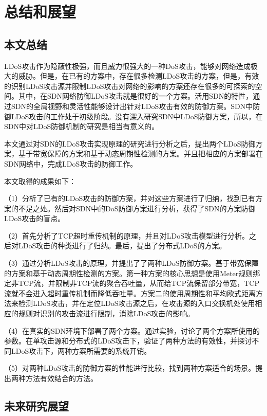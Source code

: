 \chapter{总结和展望}
\label{cha:conclusion}

\section{本文总结}
\label{chap6:conclusion}

LDoS攻击作为隐蔽性极强，而且威力很强大的一种DoS攻击，能够对网络造成极大的威胁。但是，在已有的方案中，存在很多检测LDoS攻击的方案，但是，有效的识别LDoS攻击源并限制LDoS攻击对网络的影响的方案还存在很多的可探索的空间。其中，在SDN网络防御LDoS攻击就是很好的一个方案。活用SDN的特性，通过SDN的全局视野和灵活性能够设计出针对LDoS攻击有效的防御方案。SDN中防御LDoS攻击的工作处于初级阶段。没有深入研究SDN中LDoS防御方案，所以，在SDN中对LDoS防御机制的研究是相当有意义的。

本文通过对SDN的LDoS攻击实现原理的研究进行分析之后，提出两个LDoS防御方案，基于带宽保障的方案和基于动态周期性检测的方案。并且把相应的方案部署在SDN网络中，完成LDoS攻击的防御工作。

\noindent 本文取得的成果如下：

（1）分析了已有的LDoS攻击的防御方案，并对这些方案进行了归纳，找到已有方案的不足之处。然后对SDN中的DoS防御方案进行分析，获得了SDN的方案防御LDoS攻击的盲点。

（2）首先分析了TCP超时重传机制的原理，并且对LDoS攻击模型进行分析。之后对LDoS攻击的种类进行了归纳。最后，提出了分布式LDoS的方案。

（3）通过分析LDoS攻击的原理，并提出了了两种LDoS防御方案。基于带宽保障的方案和基于动态周期性检测的方案。第一种方案的核心思想是使用Meter规则绑定非TCP流，并限制非TCP流的聚合吞吐量，从而给TCP流保留部分带宽，TCP流就不会进入超时重传机制而降低吞吐量。方案二的使用周期性和平均欧式距离方法来检测LDoS攻击，并在定位LDoS攻击源之后，在攻击源的入口交换机处使用相应的规则对识别的攻击流进行限制，消除LDoS攻击的影响。

（4）在真实的SDN环境下部署了两个方案。通过实验，讨论了两个方案所使用的参数。在单攻击源和分布式的LDoS攻击下，验证了两种方法的有效性，并探讨不同LDoS攻击下，两种方案所需要的系统开销。

（5）对两种LDoS攻击的防御方案的性能进行比较，找到两种方案适合的场景。提出两种方法有效结合的方法。


\section{未来研究展望}
\label{chap6:expection}

